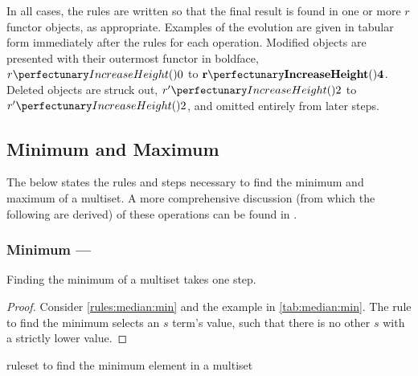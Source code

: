 In all cases, the rules are written so that the final result is found in one or more \(r\) functor objects, as appropriate.  Examples of the evolution are given in tabular form immediately after the rules for each operation.  Modified objects are presented with their outermost functor in boldface, \eg{} \(\cpfunc{r}{0}\) to \(\mathbf{\cpfunc{r}{4}}\).  Deleted objects are struck out, \eg{} \(\cpfunc{r'}{2}\) to \sout{\(\cpfunc{r'}{2}\)}, and omitted entirely from later steps.


\subsection{\label{sec:median:minmax}Minimum and Maximum}

The below states the rules and steps necessary to find the minimum and maximum of a multiset.  A more comprehensive discussion (from which the following are derived) of these operations can be found in \cite{Cooper2019,Nicolescu2018}.

\subsubsection{Minimum --- }\label{sec:median:min}

\begin{proposition}\label{prop:median:min}
Finding the minimum of a multiset takes one step.
\end{proposition}

\begin{proof}
Consider \cref{rules:median:min} and the example in \cref{tab:median:min}.  The rule to find the minimum selects an \(s\) term's value, such that there is no other \(s\) with a strictly lower value.
\end{proof}

\begin{cprulesetfloat}
\begin{cpruleset}
\end{cpruleset}
\caption{\label{rules:median:min}\Gls{ruleset} to find the minimum element in a multiset}
\end{cprulesetfloat}

